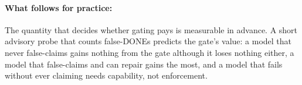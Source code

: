 \paragraph{What follows for practice:} The quantity that decides whether gating pays is measurable in advance. A short advisory probe that counts false-DONEs predicts the gate's value: a model that never false-claims gains nothing from the gate although it loses nothing either, a model that false-claims and can repair gains the most, and a model that fails without ever claiming needs capability, not enforcement.
